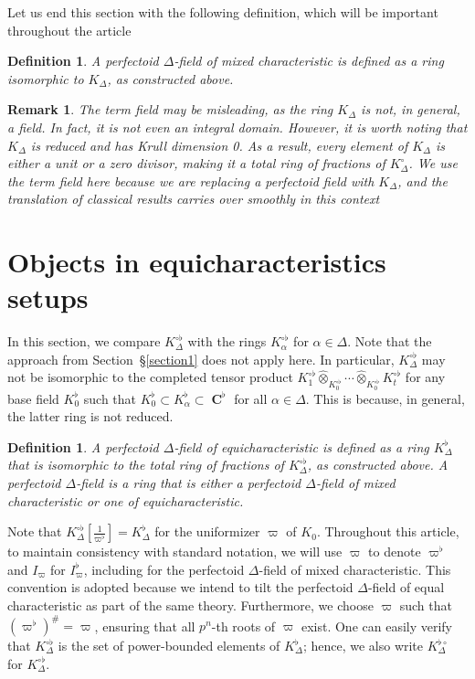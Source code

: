 \documentclass[12pts,a4paper]{amsart}
\newtheorem{remark}[proposition]{Remark}
\newtheorem{definition}[proposition]{Definition}
\DeclareMathOperator{\C}{\textbf{C}}
\begin{document}
Let us end this section with the following definition, which will be important throughout the article
\begin{definition}
    A \emph{perfectoid $\Delta$-field} of mixed characteristic is defined as a ring isomorphic to $K_\Delta$, as constructed above.
\end{definition}

\begin{remark}
     The term field may be misleading, as the ring $K_\Delta$ is not, in general, a field. In fact, it is not even an integral domain. However, it is worth noting that $K_\Delta$ is reduced and has Krull dimension 0. As a result, every element of $K_\Delta$ is either a unit or a zero divisor, making it a total ring of fractions of $K^\circ_\Delta$. We use the term field here because we are replacing a perfectoid field with $K_\Delta$, and the translation of classical results carries over smoothly in this context
\end{remark}


\section{Objects in equicharacteristics setups}

In this section, we compare $K^{\circ\flat}_\Delta$ with the rings $K^{\circ\flat}_\alpha$ for $\alpha \in \Delta$. Note that the approach from Section~\S\ref{section1} does not apply here. In particular, $K^{\circ\flat}_\Delta$ may not be isomorphic to the completed tensor product $K^{\circ\flat}_1 \widehat{\otimes}_{K^{\circ\flat}_0} \cdots \widehat{\otimes}_{K^{\circ\flat}_0} K^{\circ\flat}_t$ for any base field $K^\flat_0$ such that $K^\flat_0 \subset K^\flat_\alpha \subset \C^\flat$ for all $\alpha\in\Delta$. This is because, in general, the latter ring is not reduced.

\begin{definition}
   A \emph{perfectoid $\Delta$-field} of equicharacteristic is defined as a ring $K^\flat_\Delta$ that is isomorphic to the total ring of fractions of $K^{\circ\flat}_\Delta$, as constructed above. A \emph{perfectoid $\Delta$-field} is a ring that is either a perfectoid $\Delta$-field of mixed characteristic or one of equicharacteristic.
\end{definition}

Note that $K^{\circ\flat}_\Delta\left[\frac{1}{\varpi^\flat}\right]=K^\flat_\Delta$ for the uniformizer $\varpi$ of $K_0$. 
Throughout this article, to maintain consistency with standard notation, we will use $\varpi$ to denote $\varpi^\flat$ and $I_\varpi$ for $I^\flat_\varpi$, including for the perfectoid $\Delta$-field of mixed characteristic. 
This convention is adopted because we intend to tilt the perfectoid $\Delta$-field of equal characteristic as part of the same theory. 
Furthermore, we choose $\varpi$ such that $(\varpi^\flat)^\#=\varpi$, ensuring that all $p^n$-th roots of $\varpi$ exist. 
One can easily verify that $K^{\circ\flat}_\Delta$ is the set of power-bounded elements of $K^\flat_\Delta$; hence, we also write $K^{\flat\circ}_\Delta$ for $K^{\circ\flat}_\Delta$.
\end{document}

